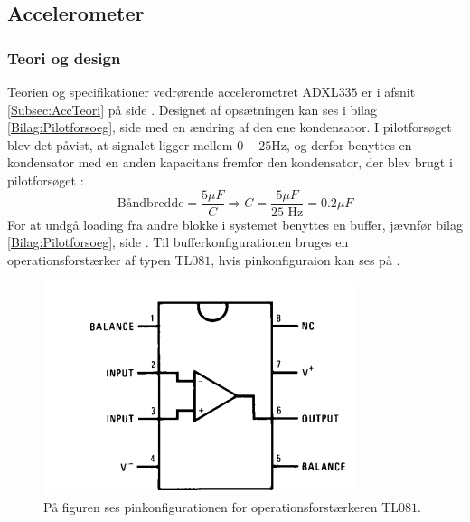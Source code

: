 \subsection{Accelerometer}\label{Acc_afsnit}
\subsubsection{Teori og design}
Teorien og specifikationer vedrørende accelerometret ADXL$335$ er i afsnit \ref{Subsec:AccTeori} på side \pageref{Subsec:AccTeori}. Designet af opsætningen kan ses i bilag \ref{Bilag:Pilotforsoeg}, side \pageref{Bilag:Pilotforsoeg} med en ændring af den ene kondensator. I pilotforsøget blev det påvist, at signalet ligger mellem $0-25$Hz, og derfor benyttes en kondensator med en anden kapacitans fremfor den kondensator, der blev brugt i pilotforsøget \cite{Devices2009}:
\begin{equation}
\text{Båndbredde} = \dfrac{5\mu F}{C} \Rightarrow  C = \dfrac{5\mu F}{\text{25 Hz}} = 0.2\mu F
\end{equation}
For at undgå loading fra andre blokke i systemet benyttes en buffer, jævnfør bilag \ref{Bilag:Pilotforsoeg}, side \pageref{Bilag:Pilotforsoeg}. Til bufferkonfigurationen bruges en operationsforstærker af typen TL$081$, hvis pinkonfiguraion kan ses på . 

\begin{figure}[H]
	\centering
	\includegraphics[scale=.8]{figures/cProblemloesning/TL081.PNG}
	\caption{På figuren ses pinkonfigurationen for operationsforstærkeren TL$081$.\cite{Instruments1995}}
	\label{fig:TL081}
\end{figure}

